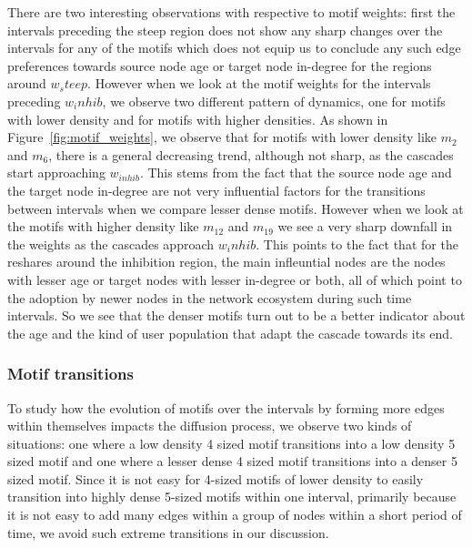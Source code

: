 \documentclass[smallextended]{svjour3}       %
\theoremstyle{definition}
\begin{document}
 There are two interesting observations with respective to motif weights: first the intervals preceding the steep region does not show any sharp changes over the intervals for any of the motifs which does not equip us to conclude any such edge preferences towards source node age or target node in-degree for the regions around $w_steep$. However when we look at the motif weights for the intervals preceding $w_inhib$, we observe two different pattern of dynamics, one for motifs with lower density and for motifs with higher densities. As shown in Figure~\ref{fig:motif_weights}, we observe that for motifs with lower density like $m_2$ and $m_6$, there is a general decreasing trend, although not sharp, as the cascades start approaching $w_{inhib}$. This stems from the fact that the source node age and the target node in-degree are not very influential factors for the transitions between intervals when we compare lesser dense motifs. However when we look at the motifs with higher density like $m_{12}$ and $m_{19}$ we see a very sharp downfall in the weights as the cascades approach $w_inhib$. This points to the fact that for the reshares around the inhibition region, the main infleuntial nodes are the nodes with lesser age or target nodes with lesser in-degree or both, all of which point to the adoption by newer nodes in the network ecosystem during such time intervals. So we see that the denser motifs turn out to be a better indicator about the age and the kind of user population that adapt the cascade towards its end.


\subsubsection{Motif transitions}
To study how the evolution of motifs over the intervals by forming more edges within themselves impacts the diffusion process, we observe two kinds of situations: one where a low density 4 sized motif transitions into a low density 5 sized motif and one where a lesser dense 4 sized motif transitions into a denser 5 sized motif. 
Since it is not easy for 4-sized motifs of lower density to easily transition into highly dense 5-sized motifs within one interval, primarily because it is not easy to add many edges within a group of nodes within a short period of time, we avoid such extreme transitions in our discussion. 
\end{document}
